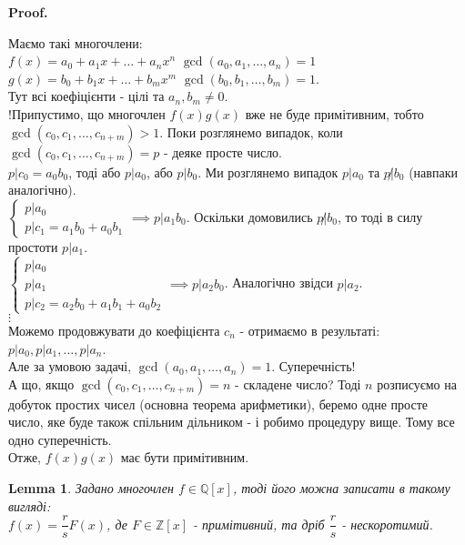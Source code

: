 \documentclass[a4paper, 14pt]{extarticle}
\makeatletter
\theoremstyle{theoremdd}
\theoremstyle{theoremdd}
\theoremstyle{theoremdd}
\theoremstyle{theoremdd}
\theoremstyle{theoremdd}
\theoremstyle{theoremdd}
\theoremstyle{theoremdd}
\newtheorem{lemma}[theorem]{Lemma}
\theoremstyle{theoremdd}
\def\qed{$\blacksquare$}
\renewenvironment{proof}[1][Proof.\\]{\par
\pushQED{\hfill \qed}%
\normalfont \topsep6\p@\@plus6\p@\relax
\trivlist
\item\relax
{\bfseries
#1\@addpunct{.}}\hspace\labelsep\ignorespaces
}{%
\popQED\endtrivlist\@endpefalse
}
\makeatother
\begin{document}
\begin{proof}
Маємо такі многочлени:\\
$f(x) = a_0 + a_1x + \dots + a_nx^n$ \hspace{1cm} $\gcd(a_0,a_1,\dots,a_n) = 1$ \\
$g(x) = b_0 + b_1x + \dots + b_mx^m$ \hspace{1cm} $\gcd(b_0,b_1,\dots,b_m) = 1$.\\
Тут всі коефіцієнти - цілі та $a_n, b_m \neq 0$.\\
!Припустимо, що многочлен $f(x)g(x)$ вже не буде примітивним, тобто $\gcd(c_0,c_1,\dots,c_{n+m}) > 1$. Поки розглянемо випадок, коли $\gcd(c_0,c_1,\dots,c_{n+m}) = p$ - деяке просте число.\\
$p | c_0 = a_0b_0$, тоді або $p | a_0$, або $p | b_0$. Ми розглянемо випадок $p | a_0$ та $p \not| b_0$ (навпаки аналогічно).\\
$\begin{cases} p | a_0 \\ p | c_1 = a_1b_0+a_0b_1 \end{cases} \implies p | a_1b_0$. Оскільки домовились $p \not| b_0$, то тоді в силу простоти $p | a_1$.\\
$\begin{cases}
p | a_0 \\
p | a_1 \\
p | c_2 = a_2b_0 + a_1b_1 + a_0b_2
\end{cases} \implies p | a_2b_0
$. Аналогічно звідси $p | a_2$.\\
$\vdots$\\
Можемо продовжувати до коефіцієнта $c_n$ - отримаємо в результаті:\\
$p | a_0, p | a_1, \dots, p | a_n$.\\
Але за умовою задачі, $\gcd(a_0,a_1,\dots,a_n) = 1$. Суперечність!
\bigskip \\
А що, якщо $\gcd(c_0,c_1,\dots,c_{n+m}) = n$ - складене число? Тоді $n$ розписуємо на добуток простих чисел (основна теорема арифметики), беремо одне просте число, яке буде також спільним дільником - і робимо процедуру вище. Тому все одно суперечність.\\
Отже, $f(x)g(x)$ має бути примітивним.
\end{proof}

\begin{lemma}
Задано многочлен $f \in \mathbb{Q}[x]$, тоді його можна записати в такому вигляді:\\
$f(x) = \dfrac{r}{s} F(x)$, де $F \in \mathbb{Z}[x]$ - примітивний, та дріб $\dfrac{r}{s}$ - нескоротимий.
\end{lemma}
\end{document}
